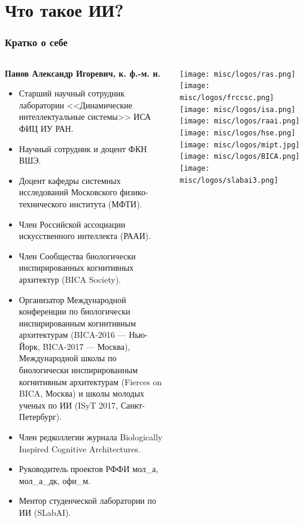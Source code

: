 \documentclass[default]{beamer}
\begin{document}
	\section{Что такое ИИ?}
	\begin{frame}
		\frametitle{Кратко о себе}
		\scriptsize
		\begin{columns}
			\begin{column}{0.85\textwidth}
				\textbf{Панов Александр Игоревич, к. ф.-м. н.}
				\begin{itemize}
					\item Старший научный сотрудник лаборатории <<Динамические интеллектуальные системы>> ИСА ФИЦ ИУ РАН.
					\item Научный сотрудник и доцент ФКН ВШЭ.
					\item Доцент кафедры системных исследований Московского физико-технического института (МФТИ).
					\item Член Российской ассоциации искусственного интеллекта (РААИ).
					\item Член Сообщества биологически инспирированных когнитивных архитектур (BICA Society).
					\item Организатор Международной конференции по биологически инспирированным когнитивным архитектурам (BICA-2016 --- Нью-Йорк, BICA-2017 --- Москва), Международной школы по биологически инспирированным когнитивным архитектурам (Fierces on BICA, Москва) и школы молодых ученых по ИИ (ISyT 2017, Санкт-Петербург).
					\item Член редколлегии журнала Biologically Inspired Cognitive Architectures.					
					\item Руководитель проектов РФФИ мол\_а, мол\_а\_дк, офи\_м.
					\item Ментор студенческой лаборатории по ИИ (SLabAI).
				\end{itemize}
			\end{column}
			
			\begin{column}{0.15\textwidth}
				\centering
				\texttt{[image: misc/logos/ras.png]}
				\vspace{7pt}
				\texttt{[image: misc/logos/frccsc.png]}
				\vspace{7pt}
				\texttt{[image: misc/logos/isa.png]}
				\vspace{7pt}
				\texttt{[image: misc/logos/raai.png]}
				\vspace{7pt}
				\texttt{[image: misc/logos/hse.png]}
				\vspace{7pt}
				\texttt{[image: misc/logos/mipt.jpg]}
				\vspace{5pt}
				\texttt{[image: misc/logos/BICA.png]}
				\vspace{5pt}
				\texttt{[image: misc/logos/slabai3.png]}
			\end{column}
			
		\end{columns}
	\end{frame}	
\end{document}
